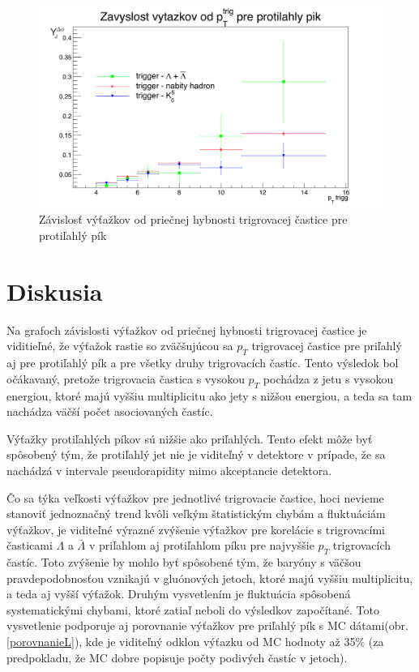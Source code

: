 \documentclass[thesismargins, thesislinespacing]{rnthesis}
\begin{document}
\begin{figure}[hbtp!]
	\centering
	\includegraphics[width=\textwidth]{./Obrazky_praca/vytazok_away.png}
	\caption{Závislosť výťažkov od priečnej hybnosti trigrovacej častice pre protiľahlý pík}
	\label{away}
\end{figure}

\chapter{Diskusia}
 
Na grafoch závislosti výťažkov od priečnej hybnosti trigrovacej častice je viditieľné, že výťažok rastie so zväčšujúcou sa $p_T$ trigrovacej častice pre priľahlý aj pre protiľahlý pík a pre všetky druhy trigrovacích častíc. Tento výsledok bol očákavaný, pretože trigrovacia častica s vysokou $p_T$ pochádza z jetu s vysokou energiou, ktoré majú vyššiu multiplicitu ako jety s nižšou energiou, a teda sa tam nachádza väčší počet asociovaných častíc. 

Výťažky protiľahlých píkov sú nižšie ako priľahlých. Tento efekt môže byť spôsobený tým, že protiľahlý jet nie je viditeľný v detektore v prípade, že sa nachádzá v intervale pseudorapidity mimo akceptancie detektora. 

Čo sa týka veľkosti výťažkov pre jednotlivé trigrovacie častice, hoci nevieme stanoviť jednoznačný trend kvôli veľkým štatistickým chybám a fluktuáciám výťažkov, je viditeľné výrazné zvýšenie výťažkov pre korelácie s trigrovacími časticami $\Lambda$ a $\bar{\Lambda}$ v priľahlom aj protiľahlom píku pre najvyššie $p_T$ trigrovacích častíc. Toto zvýšenie by mohlo byť spôsobené tým, že baryóny s väčšou pravdepodobnosťou vznikajú v gluónových jetoch, ktoré majú vyššiu multiplicitu, a teda aj vyšší výťažok. Druhým vysvetlením je fluktuácia spôsobená systematickými chybami, ktoré zatiaľ neboli do výsledkov započítané. Toto vysvetlenie podporuje aj porovnanie výťažkov pre priľahlý pík s MC dátami(obr. \ref{porovnanieL}), kde je viditeľný odklon výťazku od MC hodnoty až 35\% (za predpokladu, že MC dobre popisuje počty podivých častíc v jetoch).    
\end{document}
